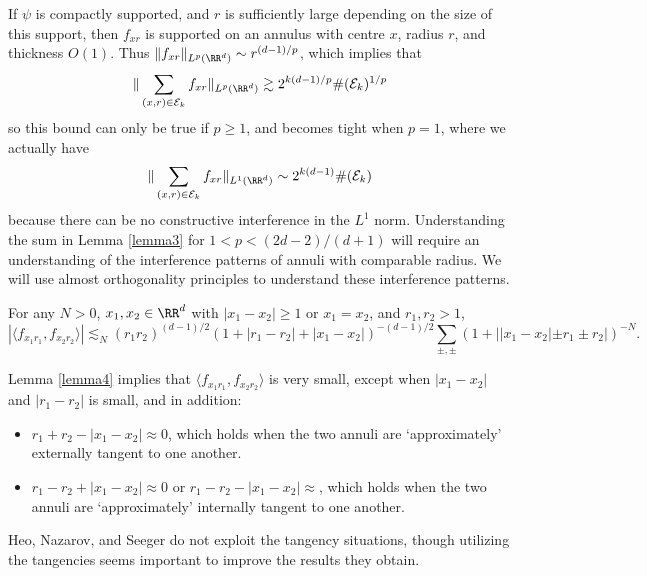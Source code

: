 If $\psi$ is compactly supported, and $r$ is sufficiently large depending on the size of this support, then $f_{xr}$ is supported on an annulus with centre $x$, radius $r$, and thickness $O(1)$. Thus $\| f_{xr} \|_{L^p(\RR^d)} \sim r^{(d-1)/p}$, which implies that
%
\[ \| \sum_{(x,r) \in \mathcal{E}_k} f_{xr} \|_{L^p(\RR^d)} \gtrsim 2^{k(d-1)/p} \#(\mathcal{E}_k)^{1/p} \]
%
so this bound can only be true if $p \geq 1$, and becomes tight when $p = 1$, where we actually have
%
\[ \| \sum_{(x,r) \in \mathcal{E}_k} f_{xr} \|_{L^1(\RR^d)} \sim 2^{k(d-1)} \#(\mathcal{E}_k) \]
%
because there can be no constructive interference in the $L^1$ norm. Understanding the sum in Lemma \ref{lemma3} for $1 < p < (2d-2)/(d+1)$ will require an understanding of the interference patterns of annuli with comparable radius. We will use almost orthogonality principles to understand these interference patterns.

\begin{lemma} \label{lemma4}
    For any $N > 0$, $x_1,x_2 \in \RR^d$ with $|x_1 - x_2| \geq 1$ or $x_1 = x_2$, and $r_1,r_2 > 1$,
    \[ |\langle f_{x_1r_1}, f_{x_2r_2} \rangle| \lesssim_N (r_1r_2)^{(d-1)/2} (1 + |r_1 - r_2| + |x_1 - x_2|)^{-(d-1)/2} \sum_{\pm,\pm} (1 + ||x_1 - x_2| \pm r_1 \pm r_2|)^{-N}. \]
\end{lemma}

\begin{remark}
    Lemma \ref{lemma4} implies that $\langle f_{x_1r_1}, f_{x_2r_2} \rangle$ is very small, except when $|x_1 - x_2|$ and $|r_1 - r_2|$ is small, and in addition:
    \begin{itemize}
        \item $r_1 + r_2 - |x_1 - x_2| \approx 0$, which holds when the two annuli are `approximately' externally tangent to one another.

        \item $r_1 - r_2 + |x_1 - x_2| \approx 0$ or $r_1 - r_2 - |x_1 - x_2| \approx$, which holds when the two annuli are `approximately' internally tangent to one another.
    \end{itemize}
    Heo, Nazarov, and Seeger do not exploit the tangency situations, though utilizing the tangencies seems important to improve the results they obtain.
\end{remark}

